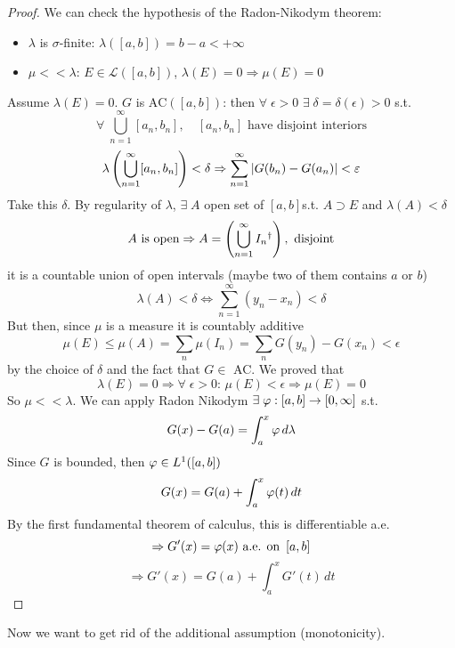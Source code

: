 \begin{proof}
We can check the hypothesis of the Radon-Nikodym theorem:
\begin{itemize}
    \item \(\lambda\) is \(\sigma\)-finite: \(\lambda([a,b]) = b-a < +\infty\)
    \item \(\mu << \lambda\): \(E \in \mathcal{L}([a,b])\), \(\lambda(E) = 0 \Rightarrow \mu(E) = 0\)
\end{itemize}
Assume \(\lambda(E) = 0\). \(G\) is \(\mbox{AC}([a,b])\): then \(\forall \; \epsilon > 0\) \(\exists \; \delta = \delta(\epsilon) > 0\) s.t. 
\[
    \forall \; \bigcup_{n=1}^{\infty} [a_n, b_n], \quad [a_n, b_n] \mbox{ have disjoint interiors}
\]
\[
    \lambda\left(\bigcup_{n=1}^{\infty} [a_n, b_n]\right) < \delta \Rightarrow \sum_{n=1}^{\infty} \abs{G(b_n) - G(a_n)} < \varepsilon
\]
Take this \(\delta\). By regularity of \(\lambda\), \(\exists \; A \) open set of \(\left[a, b\right]\)s.t. \(A \supset E\) and \(\lambda(A) < \delta\)
\[
    A \mbox{ is open} \Rightarrow A = \left( \bigcup_{n=1}^{\infty} I_n \symbolfootnotemark[2]{\mbox{open intervals } = (x, y)} \right), \mbox{ disjoint}
    \symbolfootnotetext[2]{open intervals = \((x_n, y_n)\)}
\] 
it is a countable union of open intervals (maybe two of them contains \(a\) or \(b\))
\[
    \lambda(A) < \delta \Leftrightarrow \sum_{n=1}^{\infty} (y_n - x_n) < \delta
\]
But then, since \(\mu\) is a measure it is countably additive
\[
    \mu (E) \leq \mu(A) = \sum_n \mu (I_n) = \sum_n G(y_n) - G(x_n) < \epsilon
\]
by the choice of \(\delta \) and the fact that \(G \in\) AC.
We proved that 
\[
    \lambda(E) = 0 \Rightarrow \forall \; \epsilon >0 : \, \mu(E) < \epsilon \Rightarrow \mu(E) =0
\]
So \(\mu << \lambda\). We can apply Radon Nikodym \(\exists \; \oldphi : \left[ a, b\right] \to \left[0, \infty\right]\) s.t. 
\[
    G(x) - G(a) = \int_a^x \oldphi \, d\lambda
\]
Since \(G\) is bounded, then \(\oldphi \in L^1(\left[a, b\right])\)
\[
    G(x)=G(a) + \int_a^x \oldphi(t) \, dt
\]
By the first fundamental theorem of calculus, this is differentiable a.e. 
\[
    \Rightarrow G'(x) = \oldphi(x) \text{ a.e. on } \left[a, b\right]
\]
\[
    \Rightarrow G'(x) = G(a) + \int_a^x G'(t) \, dt
\]
\end{proof}
Now we want to get rid of the additional assumption (monotonicity).

